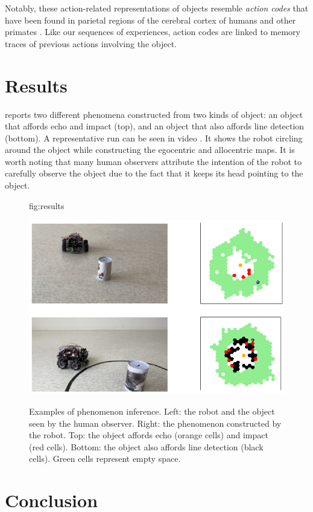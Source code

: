\documentclass[pmlr]{jmlr}%
\begin{document}
Notably, these action-related representations of objects resemble \textit{action codes} that have been found in parietal regions of the cerebral cortex of humans and other primates \citep{chao_representation_2000,colby_space_1999, schubotz_objects_2014}. 
Like our sequences of experiences, action codes are linked to memory traces of previous actions involving the object.


\section{Results}

 reports two different phenomena constructed from two kinds of object: an object that affords echo and impact (top), and an object that also affords line detection (bottom).
A representative run can be seen in video \citep{titouan_knockaert_demonstration_2022}.
It shows the robot circling around the object while constructing the egocentric and allocentric maps. 
It is worth noting that many human observers attribute the intention of the robot to carefully observe the object due to the fact that it keeps its head pointing to the object. 

\begin{figure}[htbp]
	\floatconts
	{fig:results}
	{\caption{Examples of phenomenon inference.
			  Left: the robot and the object seen by the human observer.
			  Right: the phenomenon constructed by the robot. 
			  Top: the object affords echo (orange cells) and impact (red cells). 
			  Bottom: the object also affords line detection (black cells). 
			  Green cells represent empty space.}}
	{\includegraphics[width=0.6\linewidth]{images/Figure_3_results}}
\end{figure}


\section{Conclusion}
\end{document}
